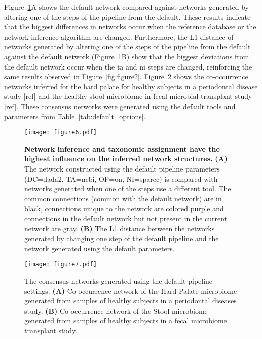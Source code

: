   Figure~\ref{fig:figure6}A shows the default network compared against networks generated by altering one of the steps of the pipeline from the default.
  These results indicate that the biggest differences in networks occur when the reference database or the network inference algorithm are changed.
  Furthermore, the L1 distance of networks generated by altering one of the steps of the pipeline from the default against the default network (Figure~\ref{fig:figure6}B) show that the biggest deviations from the default network occur when the \ac{ta} and \ac{ni} steps are changed, reinforcing the same results observed in Figure~\ref{fig:figure2}. Figure~\ref{fig:figure7} shows the co-occurrence networks inferred for the hard palate for healthy subjects in a periodontal disease study [ref] and the healthy stool microbiome in fecal microbial transplant study [ref]. These consensus networks were generated using the default tools and parameters from Table~\ref{tab:default_options}.

  \begin{figure}[h]
    \centering
    \texttt{[image: figure6.pdf]}
    \caption{
      \textbf{Network inference and taxonomic assignment have the highest influence on the inferred network structures.}
      \textbf{(A)} The network constructed using the default pipeline parameters (DC=\ac{dada2}, TA=\ac{ncbi}, OP=on, NI=\ac{sparcc}) is compared with networks generated when one of the steps use a different tool.
      The common connections (common with the default network) are in black, connections unique to the network are colored purple and connections in the default network but not present in the current network are gray.
      \textbf{(B)} The L1 distance between the networks generated by changing one step of the default pipeline and the network generated using the default parameters.
    }
    \label{fig:figure6}
  \end{figure}


  \begin{figure}[h]
    \centering
    \texttt{[image: figure7.pdf]}
    \caption{
      The consensus networks generated using the default pipeline settings.
      \textbf{(A)} Co-occurrence network of the Hard Palate microbiome generated from samples of healthy subjects in a periodontal diseases study.
      \textbf{(B)} Co-occurrence network of the Stool microbiome generated from samples of healthy subjects in a fecal microbiome transplant study.
  }
    \label{fig:figure7}
  \end{figure}
